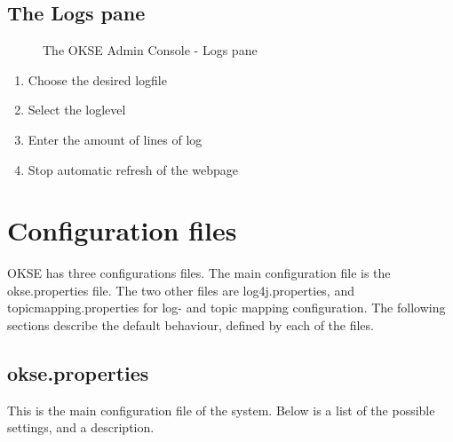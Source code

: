 \subsection{The Logs pane}
\begin{center}
  \begin{figure}[ht!]
    \caption{The OKSE Admin Console - Logs pane} 
    \label{fig:OKSE Admin Console - Logs pane}
  \end{figure}
\end{center}
\begin{enumerate}
\item Choose the desired logfile
\item Select the loglevel
\item Enter the amount of lines of log
\item Stop automatic refresh of the webpage
\end{enumerate}

\clearpage

\section{Configuration files}
\label{sec:configuration_files}
OKSE has three configurations files. The main configuration file is the okse.properties file. The two other files are log4j.properties, and topicmapping.properties for log- and topic mapping configuration. The following sections describe the default behaviour, defined by each of the files.

\subsection{okse.properties}
\label{subsec:configuration_files-okse.properties}
 
This is the main configuration file of the system. Below is a list of the possible settings, and a description.

